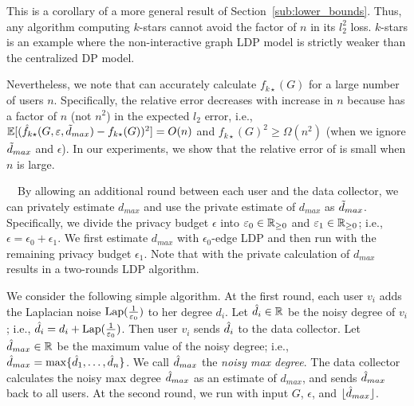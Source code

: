This is a corollary of a more general result of Section~\ref{sub:lower_bounds}. Thus,
any algorithm computing $k$-stars cannot avoid the factor of $n$ in its $l_2^2$
loss. $k$-stars 
is an example where the non-interactive graph LDP model is strictly weaker than
the centralized DP model.

Nevertheless, we note that  can accurately calculate $f_{k\star}(G)$ for a large number of users $n$. 
Specifically, the relative error decreases with increase in $n$ 
because  has a factor of $n$ (not $n^2$) in the expected $l_2$ error, i.e., 
$\mathbb{E}[(\hat{f}_{k\star}(G, \varepsilon, \tilde{d}_{max}) - f_{k\star}(G))^2] = O(n)$ and $f_{k\star}(G)^2 \geq \Omega(n^2)$ (when we ignore $\tilde{d}_{max}$ and $\epsilon$). 
In our experiments, we show that the relative error of  is 
small when $n$ is large.

\smallskip
{}~~By allowing an additional round between each user and the data collector, we can privately estimate $d_{max}$ and use the private estimate of $d_{max}$ as $\tilde{d}_{max}$. 
Specifically, 
we divide the privacy budget $\epsilon$ into 
$\varepsilon_0 \in \mathbb{R}_{\ge0}$ and $\varepsilon_1 \in \mathbb{R}_{\ge0}$; i.e., $\epsilon = \epsilon_0 + \epsilon_1$. 
We first estimate $d_{max}$ with $\epsilon_0$-edge LDP and then run  with the remaining privacy budget $\epsilon_1$. 
Note that  with the private calculation of $d_{max}$ results in a two-rounds LDP algorithm.

We consider the following simple algorithm. 
At the first round, 
each user $v_i$ adds the Laplacian noise $\textrm{Lap}(\frac{1}{\varepsilon_0})$ to her degree $d_i$. 
Let $\hat{d}_i \in \mathbb{R}$ be the noisy degree of $v_i$; i.e., $\hat{d}_i = d_i + \textrm{Lap}(\frac{1}{\varepsilon_0})$. 
Then user $v_i$ sends $\hat{d}_i$ to the data collector. 
Let $\hat{d}_{max} \in \mathbb{R}$ be the maximum value of the noisy degree; i.e., $\hat{d}_{max} = \max\{\hat{d}_1, \ldots, \hat{d}_n\}$. 
We call $\hat{d}_{max}$ the \textit{noisy max degree}. 
The data collector calculates the noisy max degree $\hat{d}_{max}$ 
as 
an estimate of $d_{max}$, 
and sends $\hat{d}_{max}$ back to all users. 
At the second round, we run  
with input $G$, 
$\epsilon$, and $\lfloor \hat{d}_{max} \rfloor$.

